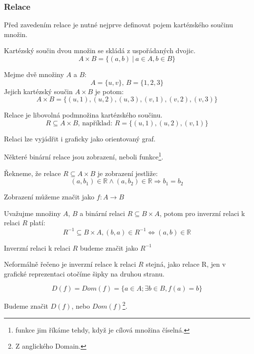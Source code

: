 \subsubsection*{Relace}
Před zavedením relace je nutné nejprve definovat pojem kartézského součinu množin.
\begin{definition} 
	Kartézský součin dvou množin se skládá z uspořádaných dvojic.
	$$A \times B = \{(a, b)\: | \: a \in A, b \in B\}$$
\end{definition}
\begin{example}
	Mejme dvě množiny $A$ a $B$:
    \[A = \{u, v\}
	\textrm{, }
	B = \{1, 2, 3\}\]
	Jejich kartézský součin $A\times B$ je potom:
	$$A \times B = \{(u, 1), (u, 2), (u, 3), (v, 1), (v, 2), (v, 3)\}$$
\end{example}

\begin{definition}[Relace]
    Relace je libovolná podmnožina kartézského součinu.
	$$R \subseteq A \times B \textrm{, například: } R = \{(u, 1), (u, 2), (v, 1)\}$$

	Relaci lze vyjádřit i graficky jako orientovaný graf.
\end{definition}


Některé binární relace jsou zobrazení, neboli funkce\footnote{funkce jim říkáme tehdy,
když je cílová množina číselná.}.

\begin{definition}[Zobrazení]
	Řekneme, že relace $R \subseteq A \times B$ je zobrazení jestliže:
	$$(a, b_1) \in \mathbb{R} \wedge (a, b_2) \in \mathbb{R} \Rightarrow b_1 = b_2$$
\end{definition}

Zobrazení můžeme značit jako $f: A \rightarrow B$

\begin{definition}
	Uvažujme množiny $A$, $B$ a binární relaci $R \subseteq B \times A$, potom pro
	inverzní relaci k relaci $R$ platí:
	$$R^{-1} \subseteq B \times A,  (b, a) \in R^{-1} \Leftrightarrow (a, b) \in \mathbb{R}$$

	Inverzní relaci k relaci $R$ budeme značit jako $R^{-1}$

	Neformálně řečeno je inverzní relace k relaci $R$ stejná, jako relace R,
	jen v grafické reprezentaci otočíme šipky na druhou stranu.
\end{definition}


\begin{definition}
	$$D(f) = Dom(f) = \{a \in A; \exists b \in B, f(a) = b\}$$

	Budeme značit $D(f)$, nebo $Dom(f)$\footnote{Z anglického Domain.}.
\end{definition}

